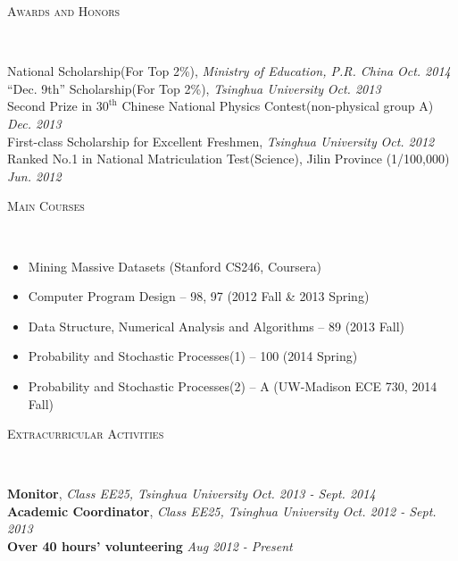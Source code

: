 \documentclass[9pt]{article}
\newenvironment{changemargin}[2]{%
  \begin{list}{}{%
    \setlength{\topsep}{0pt}%
    \setlength{\leftmargin}{#1}%
    \setlength{\rightmargin}{#2}%
    \setlength{\listparindent}{\parindent}%
    \setlength{\itemindent}{\parindent}%
    \setlength{\parsep}{\parskip}%
  }%
  \item[]}{\end{list}
}
\newcommand{\lineover}{
	\begin{changemargin}{-0.05in}{-0.05in}
		\vspace*{-8pt}
		\hrulefill \\
		\vspace*{-2pt}
	\end{changemargin}
}
\newcommand{\header}[1]{
	\begin{changemargin}{-0.5in}{-0.5in}
		\scshape{#1}\\
  	\lineover
	\end{changemargin}
}
\newenvironment{body} {
	\vspace*{-16pt}
	\begin{changemargin}{-0.25in}{-0.5in}
  }	
	{\end{changemargin}
}
\begin{document}
\header{Awards and Honors}

\begin{body}
	\vspace{14pt}
	National Scholarship(For Top 2\%), \emph{Ministry of Education, P.R. China} \hfill{} \emph{Oct. 2014}\\
	\smallskip
	``Dec. 9th'' Scholarship(For Top 2\%), \emph{Tsinghua University} \hfill{} \emph{Oct. 2013}\\
	\smallskip
	Second Prize in $30^{\mathrm{th}}$ Chinese National Physics Contest(non-physical group A) \hfill{} \emph{Dec. 2013}\\
	\smallskip
	First-class Scholarship for Excellent Freshmen, \emph{Tsinghua University} \hfill{} \emph{Oct. 2012}\\
	\smallskip
	Ranked No.1 in National Matriculation Test(Science), Jilin Province (1/100,000) \hfill{} \emph{Jun. 2012}
\end{body}

\smallskip
\smallskip

\header{Main Courses}

\begin{body}
	\vspace{14pt}

	\begin{itemize} \itemsep -0pt
		\item Mining Massive Datasets (Stanford CS246, Coursera)
		\item Computer Program Design -- 98, 97 (2012 Fall \& 2013 Spring)
		\item Data Structure, Numerical Analysis and Algorithms -- 89 (2013 Fall)
		\item Probability and Stochastic Processes(1) -- 100 (2014 Spring)
		\item Probability and Stochastic Processes(2) -- A (UW-Madison ECE 730, 2014 Fall)
	\end{itemize}

\end{body}

\smallskip
\smallskip

\header{Extracurricular Activities}

\begin{body}
	\vspace{14pt}
	\textbf {Monitor}, \emph{Class EE25, Tsinghua University} \hfill \emph{Oct. 2013 - Sept. 2014}\\

\smallskip
	\textbf {Academic Coordinator}, \emph{Class EE25, Tsinghua University} \hfill \emph{Oct. 2012 - Sept. 2013}\\

\smallskip
	\textbf{Over 40 hours' volunteering} \hfill \emph{Aug 2012 - Present}\\

\end{body}

\smallskip
\smallskip
\end{document}
